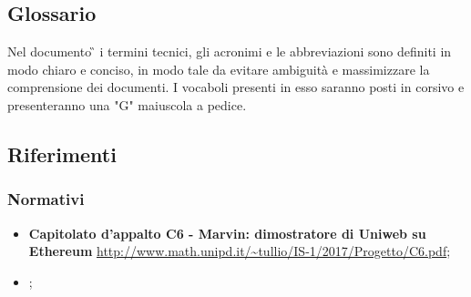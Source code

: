 \subsection{Glossario}
Nel documento \G{} i termini tecnici, gli acronimi e le abbreviazioni sono definiti in modo chiaro e conciso, in modo tale da evitare ambiguità e massimizzare la comprensione dei documenti.
\newline I vocaboli presenti in esso saranno posti in corsivo e presenteranno una "G" maiuscola a pedice.
\subsection{Riferimenti}
\subsubsection{Normativi}
\begin{itemize}
	\item
	\textbf{Capitolato d’appalto C6 - Marvin: dimostratore di Uniweb su Ethereum}
	\url{http://www.math.unipd.it/~tullio/IS-1/2017/Progetto/C6.pdf};
	
	\item
	\textbf{\NdP{}};
	 
%	
\end{itemize}

